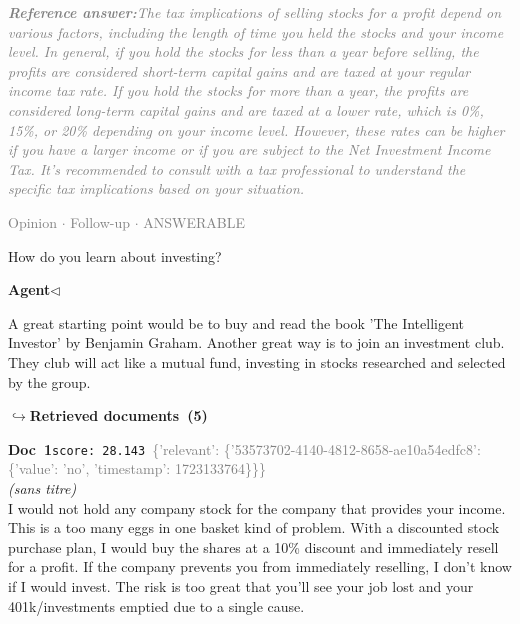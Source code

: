 \documentclass[a4paper,11pt]{article}
\begin{document}
\begin{refanswerenv}
{\footnotesize\textit{\textcolor{gray}{\textbf{Reference answer:}\enspace The tax implications of selling stocks for a profit depend on various factors, including the length of time you held the stocks and your income level. In general, if you hold the stocks for less than a year before selling, the profits are considered short-term capital gains and are taxed at your regular income tax rate. If you hold the stocks for more than a year, the profits are considered long-term capital gains and are taxed at a lower rate, which is 0\%, 15\%, or 20\% depending on your income level. However, these rates can be higher if you have a larger income or if you are subject to the Net Investment Income Tax. It's recommended to consult with a tax professional to understand the specific tax implications based on your situation.}}}
\end{refanswerenv}
\vspace{0.5em}
\hfill{\tiny\textcolor{gray}{Opinion $\cdot$ Follow-up $\cdot$ ANSWERABLE}}
\begin{userbubble}
How do you learn about investing?
\end{userbubble}
\noindent\hfill{\small\textcolor{agentcolor}{\textbf{Agent\enspace$\triangleleft$}}}
\begin{agentbubble}
A great starting point would be to buy and read the book 'The Intelligent Investor' by Benjamin Graham. Another great way is to join an investment club. They club will act like a mutual fund, investing in stocks researched and selected by the group. 
\end{agentbubble}
\noindent\hfill{\footnotesize\textcolor{doccolor}{\textbf{$\hookrightarrow$\enspace Retrieved documents~(5)}}}
\begin{docenv}
{\footnotesize\textcolor{doccolor}{\textbf{Doc~1}}}\hfill{\tiny\texttt{score:~28.143}}\ {\tiny\textcolor{gray}{\{'relevant': \{'53573702-4140-4812-8658-ae10a54edfc8': \{'value': 'no', 'timestamp': 1723133764\}\}\}}}\\[3pt]
{\small\textit{(sans titre)}}\\[2pt]
\vspace{2pt}
{\footnotesize 
I would not hold any company stock for the company that provides your income.   This is a too many eggs in one basket kind of problem. With a discounted stock purchase plan, I would buy the shares at a 10\% discount and immediately resell for a profit.   If the company prevents you from immediately reselling, I  don't know if I would invest. The risk is too great that you'll see your job lost and your 401k/investments emptied due to a single cause.}
\end{docenv}
\end{document}
